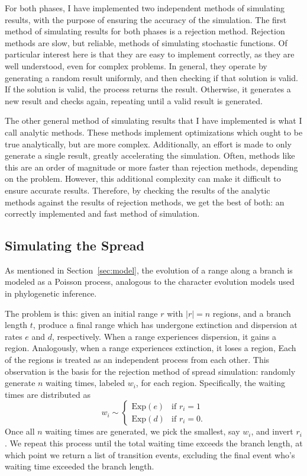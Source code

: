 \documentclass{article}
\begin{document}
For both phases, I have implemented two independent methods of simulating
results, with the purpose of ensuring the accuracy of the simulation.
The first method of simulating results for both phases is a rejection method.
Rejection methods are slow, but reliable, methods of simulating stochastic
functions.
Of particular interest here is that they are easy to implement correctly, as
they are well understood, even for complex problems.
In general, they operate by generating a random result uniformly, and then
checking if that solution is valid.
If the solution is valid, the process returns the result.
Otherwise, it generates a new result and checks again, repeating until a valid
result is generated.

The other general method of simulating results that I have implemented is what
I call analytic methods.
These methods implement optimizations which ought to be true analytically, but
are more complex.
Additionally, an effort is made to only generate a single result, greatly
accelerating the simulation.
Often, methods like this are an order of magnitude or more faster than
rejection methods, depending on the problem.
However, this additional complexity can make it difficult to ensure accurate
results.
Therefore, by checking the results of the analytic methods against the results
of rejection methods, we get the best of both: an correctly implemented and
fast method of simulation.

\subsection{Simulating the Spread}

As mentioned in Section~\ref{sec:model}, the evolution of a range along a
branch is modeled as a Poisson process, analogous to the character evolution
models used in phylogenetic inference.

The problem is this: given an initial range \( r \) with \( |r| = n \) regions,
and a branch length \( t \), produce a final range which has undergone
extinction and dispersion at rates \( e \) and \( d \), respectively.
When a range experiences dispersion, it gains a region.
Analogously, when a range experiences extinction, it loses a region, Each of
the regions is treated as an independent process from each other.
This observation is the basis for the rejection method of spread simulation:
randomly generate \( n \) waiting times, labeled \( w_i \), for each region.
Specifically, the waiting times are distributed as
\begin{equation}
	\label{eq:exp-rejection} w_i \sim
	\begin{cases}
		\text{Exp}(e) & \text{if } r_i
		= 1                            \\ \text{Exp}(d) & \text{if } r_i = 0.
	\end{cases}
\end{equation}
Once all $n$ waiting times are generated, we pick the smallest, say $w_i$, and
invert $r_i$.
We repeat this process until the total waiting time exceeds the branch length,
at which point we return a list of transition events, excluding the final event
who's waiting time exceeded the branch length.
\end{document}
